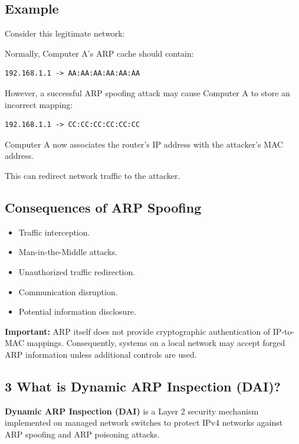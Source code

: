\subsection{Example}

Consider this legitimate network:


Normally, Computer A's ARP cache should contain:

\begin{lstlisting}
192.168.1.1 -> AA:AA:AA:AA:AA:AA
\end{lstlisting}

However, a successful ARP spoofing attack may cause Computer A to store an incorrect mapping:

\begin{lstlisting}
192.168.1.1 -> CC:CC:CC:CC:CC:CC
\end{lstlisting}

Computer A now associates the router's IP address with the attacker's MAC address.

This can redirect network traffic to the attacker.

\subsection{Consequences of ARP Spoofing}

\begin{itemize}
\item Traffic interception.
\item Man-in-the-Middle attacks.
\item Unauthorized traffic redirection.
\item Communication disruption.
\item Potential information disclosure.
\end{itemize}

\textbf{Important:} ARP itself does not provide cryptographic authentication of IP-to-MAC mappings. Consequently, systems on a local network may accept forged ARP information unless additional controls are used.

\subsection{3 What is Dynamic ARP Inspection (DAI)?}

\textbf{Dynamic ARP Inspection (DAI)} is a Layer 2 security mechanism implemented on managed network switches to protect IPv4 networks against ARP spoofing and ARP poisoning attacks.

